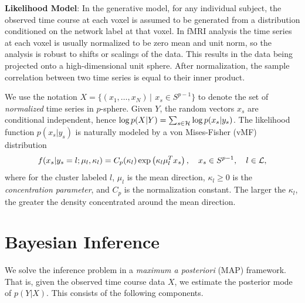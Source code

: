 \documentclass[runningheads,a4paper]{llncs}
\begin{document}
\noindent\textbf{Likelihood Model}: In the generative model, for any individual
subject, the observed time course at each voxel is assumed to be generated from
a distribution conditioned on the network label at that voxel. In fMRI analysis
the time series at each voxel is usually normalized to be zero mean and unit
norm, so the analysis is robust to shifts or scalings of the data. This results in the data being projected onto a high-dimensional
unit sphere. After normalization, the sample correlation between two time series
is equal to their inner product.


We use the notation $ X = \{ (x_1, \dots, x_N)\, |\, \ x_s \in S^{p-1} \}$
to denote the set of \emph{normalized} time series in $p$-sphere. Given $Y$, the
random vectors $ x_s$ are conditional independent, hence $\log p(
X | Y) = \sum_{s \in \mathcal{H}} \log p (x_s | y_s)$.  The likelihood function
$p( x_s | y_s)$ is naturally modeled by a von Mises-Fisher (vMF) distribution
\begin{equation}
 f ( x_s| y_s = l; \mu_l, \kappa_l) = C_p(\kappa_l) \exp \left(\kappa_l  \mu_l^T x_s\right),  \quad   x_s \in S^{p-1},  \quad  l \in {\mathcal{L}},  \label{eq:vmf}
\end{equation}
where for the cluster labeled $l$, $\mu_l$ is the mean direction, $\kappa_l \geq
0$ is the \emph{concentration parameter}, and $C_p$ is the normalization
constant. The larger the $\kappa_l$, the greater the density concentrated around
the mean direction. 




\section{Bayesian Inference}
\label{sec:inference}
We solve the inference problem in a \emph{maximum a posteriori} (MAP)
framework. That is, given the observed time course data $X$, we estimate the
posterior mode of $p(Y|X)$. This consists of the following components.
\end{document}
